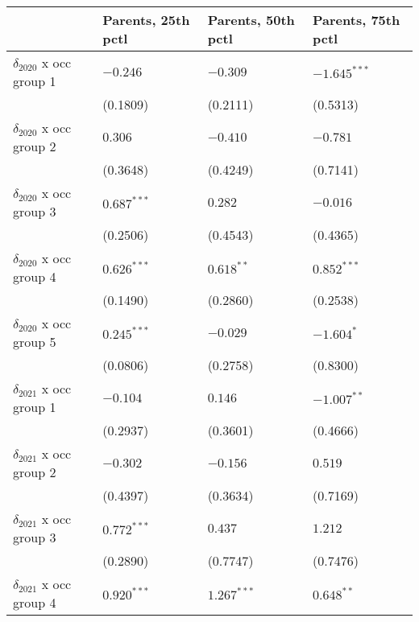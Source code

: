 \begin{tabular}{llll}
\toprule
{} & Parents, 25th pctl & Parents, 50th pctl & Parents, 75th pctl \\
\midrule
$\delta_{2020}$ x occ group 1          &           $-0.246$ &           $-0.309$ &     $-1.645^{***}$ \\
                                       &           (0.1809) &           (0.2111) &           (0.5313) \\
$\delta_{2020}$ x occ group 2          &            $0.306$ &           $-0.410$ &           $-0.781$ \\
                                       &           (0.3648) &           (0.4249) &           (0.7141) \\
$\delta_{2020}$ x occ group 3          &      $0.687^{***}$ &            $0.282$ &           $-0.016$ \\
                                       &           (0.2506) &           (0.4543) &           (0.4365) \\
$\delta_{2020}$ x occ group 4          &      $0.626^{***}$ &       $0.618^{**}$ &      $0.852^{***}$ \\
                                       &           (0.1490) &           (0.2860) &           (0.2538) \\
$\delta_{2020}$ x occ group 5          &      $0.245^{***}$ &           $-0.029$ &         $-1.604^*$ \\
                                       &           (0.0806) &           (0.2758) &           (0.8300) \\
$\delta_{2021}$ x occ group 1          &           $-0.104$ &            $0.146$ &      $-1.007^{**}$ \\
                                       &           (0.2937) &           (0.3601) &           (0.4666) \\
$\delta_{2021}$ x occ group 2          &           $-0.302$ &           $-0.156$ &            $0.519$ \\
                                       &           (0.4397) &           (0.3634) &           (0.7169) \\
$\delta_{2021}$ x occ group 3          &      $0.772^{***}$ &            $0.437$ &            $1.212$ \\
                                       &           (0.2890) &           (0.7747) &           (0.7476) \\
$\delta_{2021}$ x occ group 4          &      $0.920^{***}$ &      $1.267^{***}$ &       $0.648^{**}$ \\

\end{tabular}
